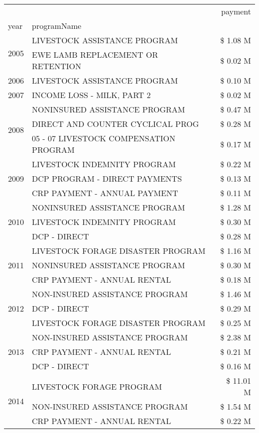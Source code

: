 \begin{tabular}{llr}
\toprule
 &  & payment \\
year & programName &  \\
\midrule
\multirow[t]{2}{*}{2005} & LIVESTOCK ASSISTANCE PROGRAM & \$ 1.08 M \\
 & EWE LAMB REPLACEMENT OR RETENTION & \$ 0.02 M \\
\cline{1-3}
2006 & LIVESTOCK ASSISTANCE PROGRAM & \$ 0.10 M \\
\cline{1-3}
2007 & INCOME LOSS - MILK, PART 2 & \$ 0.02 M \\
\cline{1-3}
\multirow[t]{3}{*}{2008} & NONINSURED ASSISTANCE PROGRAM & \$ 0.47 M \\
 & DIRECT AND COUNTER CYCLICAL PROG & \$ 0.28 M \\
 & 05 - 07 LIVESTOCK COMPENSATION PROGRAM & \$ 0.17 M \\
\cline{1-3}
\multirow[t]{3}{*}{2009} & LIVESTOCK INDEMNITY PROGRAM & \$ 0.22 M \\
 & DCP PROGRAM - DIRECT PAYMENTS & \$ 0.13 M \\
 & CRP PAYMENT - ANNUAL PAYMENT & \$ 0.11 M \\
\cline{1-3}
\multirow[t]{3}{*}{2010} & NONINSURED ASSISTANCE PROGRAM & \$ 1.28 M \\
 & LIVESTOCK INDEMNITY PROGRAM & \$ 0.30 M \\
 & DCP - DIRECT & \$ 0.28 M \\
\cline{1-3}
\multirow[t]{3}{*}{2011} & LIVESTOCK FORAGE DISASTER PROGRAM & \$ 1.16 M \\
 & NONINSURED ASSISTANCE PROGRAM & \$ 0.30 M \\
 & CRP PAYMENT - ANNUAL RENTAL & \$ 0.18 M \\
\cline{1-3}
\multirow[t]{3}{*}{2012} & NON-INSURED ASSISTANCE PROGRAM & \$ 1.46 M \\
 & DCP - DIRECT & \$ 0.29 M \\
 & LIVESTOCK FORAGE DISASTER PROGRAM & \$ 0.25 M \\
\cline{1-3}
\multirow[t]{3}{*}{2013} & NON-INSURED ASSISTANCE PROGRAM & \$ 2.38 M \\
 & CRP PAYMENT - ANNUAL RENTAL & \$ 0.21 M \\
 & DCP - DIRECT & \$ 0.16 M \\
\cline{1-3}
\multirow[t]{3}{*}{2014} & LIVESTOCK FORAGE PROGRAM & \$ 11.01 M \\
 & NON-INSURED ASSISTANCE PROGRAM & \$ 1.54 M \\
 & CRP PAYMENT - ANNUAL RENTAL & \$ 0.22 M \\

\end{tabular}
